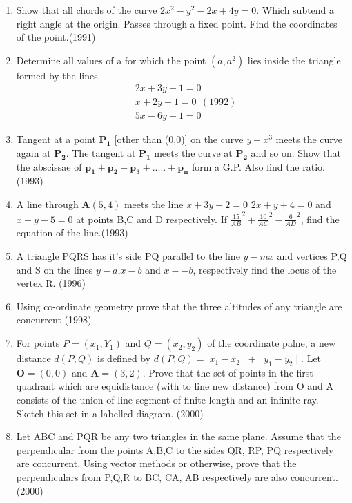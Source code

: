 \documentclass[12pt]{article}
\let\vec\mathbf
\begin{document}
\begin{enumerate}
\newpage
\item Show that all chords of the curve  $2x^2-y^2-2x+4y=0$. Which subtend a right angle at the origin. Passes through a fixed point. Find the coordinates of the point.(1991)\\
\item Determine all values of a for which the point $(a, a^2)$ lies inside the triangle formed by the lines\\
\begin{align}
 &2x+3y-1 =0 \\
 &x+2y-1 =0 \ \: (1992)\\
 &5x-6y-1 =0 
\end{align}

\item Tangent at a point $\vec{P_1}$ [other than (0,0)] on the curve $y-x^3$ meets the curve again at $\vec{P_2}$. The tangent at $\vec{P_1}$ meets the curve at $\vec{P_2}$ and so on. Show that the abscissae of $\vec{p_1+p_2+p_3+.....+p_n}$ form a G.P. Also find the ratio.(1993)\\
\item A line through $\vec{A}(5,4)$ meets the line $x+3y+2=0$ $2x+y+4=0$ and $x-y-5=0$ at points B,C and D respectively. If    $\frac{15}{AB}^2+\frac{10}{AC}^2-\frac{6}{AD}^2$, find the equation of the line.(1993)\\
\item A triangle PQRS has it's side PQ parallel to the line $y-mx$ and vertices P,Q and S on the lines $y-a$,$ x-b$ and $x--b$, respectively find the locus of the vertex R. (1996)\\
\item Using co-ordinate geometry prove that the three altitudes of any triangle are concurrent (1998)\\
\item For points $P=(x_1,Y_1)$ and $Q=(x_2,y_2)$ of the coordinate palne, a new distance $d(P,Q)$ is defined by $d(P,Q)=\mid x_1-x_2\mid + \mid y_1-y_2\mid$. Let $\vec{O}=(0,0)$  and $\vec{A}=(3,2)$. Prove that the set of points in the first quadrant which are equidistance (with to line new distance) from O and A consists of the union of line segment of finite length and an infinite ray. Sketch this set in a labelled diagram. (2000)\\
\item Let ABC and PQR be any two triangles in the same plane. Assume that the perpendicular from the points A,B,C to the sides QR, RP, PQ respectively are concurrent. Using vector methods or otherwise, prove that the perpendiculars from P,Q,R to BC, CA, AB  respectively are also concurrent. (2000)\\

\end{enumerate}
\end{document}
